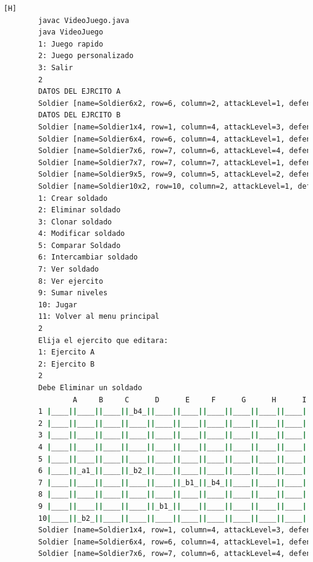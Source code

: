 \documentclass{article}
\begin{document}
	\begin{lstlisting}[language=bash,caption={Compilando y probando el programa completo  }][H]
		javac VideoJuego.java
		java VideoJuego
		1: Juego rapido
		2: Juego personalizado
		3: Salir
		2
		DATOS DEL EJRCITO A
		Soldier [name=Soldier6x2, row=6, column=2, attackLevel=1, defenseLevel=5, actualLife=1, speed=0, attitude=Repose, current=true]
		DATOS DEL EJRCITO B
		Soldier [name=Soldier1x4, row=1, column=4, attackLevel=3, defenseLevel=3, actualLife=4, speed=0, attitude=Repose, current=true]
		Soldier [name=Soldier6x4, row=6, column=4, attackLevel=1, defenseLevel=4, actualLife=2, speed=0, attitude=Repose, current=true]
		Soldier [name=Soldier7x6, row=7, column=6, attackLevel=4, defenseLevel=2, actualLife=1, speed=0, attitude=Repose, current=true]
		Soldier [name=Soldier7x7, row=7, column=7, attackLevel=1, defenseLevel=4, actualLife=4, speed=0, attitude=Repose, current=true]
		Soldier [name=Soldier9x5, row=9, column=5, attackLevel=2, defenseLevel=5, actualLife=1, speed=0, attitude=Repose, current=true]
		Soldier [name=Soldier10x2, row=10, column=2, attackLevel=1, defenseLevel=3, actualLife=2, speed=0, attitude=Repose, current=true]
		1: Crear soldado
		2: Eliminar soldado
		3: Clonar soldado
		4: Modificar soldado
		5: Comparar Soldado
		6: Intercambiar soldado
		7: Ver soldado
		8: Ver ejercito
		9: Sumar niveles
		10: Jugar
		11: Volver al menu principal
		2
		Elija el ejercito que editara:
		1: Ejercito A
		2: Ejercito B
		2
		Debe Eliminar un soldado
		    	A     B     C      D      E     F      G      H      I     J 
		1 |____||____||____||_b4_||____||____||____||____||____||____|
		2 |____||____||____||____||____||____||____||____||____||____|
		3 |____||____||____||____||____||____||____||____||____||____|
		4 |____||____||____||____||____||____||____||____||____||____|
		5 |____||____||____||____||____||____||____||____||____||____|
		6 |____||_a1_||____||_b2_||____||____||____||____||____||____|
		7 |____||____||____||____||____||_b1_||_b4_||____||____||____|
		8 |____||____||____||____||____||____||____||____||____||____|
		9 |____||____||____||____||_b1_||____||____||____||____||____|
		10|____||_b2_||____||____||____||____||____||____||____||____|
		Soldier [name=Soldier1x4, row=1, column=4, attackLevel=3, defenseLevel=3, actualLife=4, speed=0, attitude=Repose, current=true]
		Soldier [name=Soldier6x4, row=6, column=4, attackLevel=1, defenseLevel=4, actualLife=2, speed=0, attitude=Repose, current=true]
		Soldier [name=Soldier7x6, row=7, column=6, attackLevel=4, defenseLevel=2, actualLife=1, speed=0, attitude=Repose, current=true]

\end{lstlisting}
\end{document}
